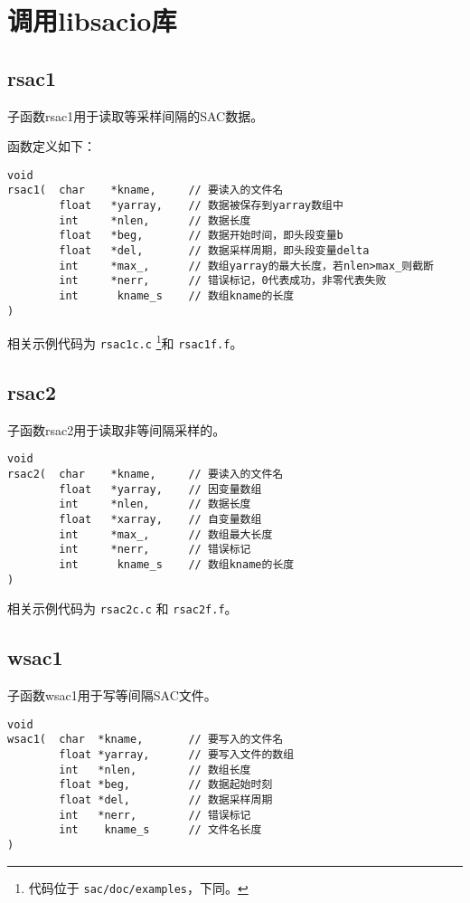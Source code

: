\section{调用libsacio库}
\label{sec:libsacio}
\subsection{rsac1}
子函数rsac1用于读取等采样间隔的SAC数据。

函数定义如下：
\begin{verbatim}
void
rsac1(  char    *kname,     // 要读入的文件名
        float   *yarray,    // 数据被保存到yarray数组中
        int     *nlen,      // 数据长度
        float   *beg,       // 数据开始时间，即头段变量b
        float   *del,       // 数据采样周期，即头段变量delta
        int     *max_,      // 数组yarray的最大长度，若nlen>max_则截断
        int     *nerr,      // 错误标记，0代表成功，非零代表失败
        int      kname_s    // 数组kname的长度
)
\end{verbatim}

相关示例代码为 \texttt{rsac1c.c} \footnote{代码位于 \texttt{sac/doc/examples}，下同。}和 \texttt{rsac1f.f}。

\subsection{rsac2}
子函数rsac2用于读取非等间隔采样的。
\begin{verbatim}
void
rsac2(  char    *kname,     // 要读入的文件名
        float   *yarray,    // 因变量数组
        int     *nlen,      // 数据长度
        float   *xarray,    // 自变量数组
        int     *max_,      // 数组最大长度
        int     *nerr,      // 错误标记
        int      kname_s    // 数组kname的长度
)
\end{verbatim}
相关示例代码为 \texttt{rsac2c.c} 和 \texttt{rsac2f.f}。

\subsection{wsac1}
子函数wsac1用于写等间隔SAC文件。
\begin{verbatim}
void
wsac1(  char  *kname,       // 要写入的文件名
        float *yarray,      // 要写入文件的数组
        int   *nlen,        // 数组长度
        float *beg,         // 数据起始时刻
        float *del,         // 数据采样周期
        int   *nerr,        // 错误标记
        int    kname_s      // 文件名长度
)
\end{verbatim}

